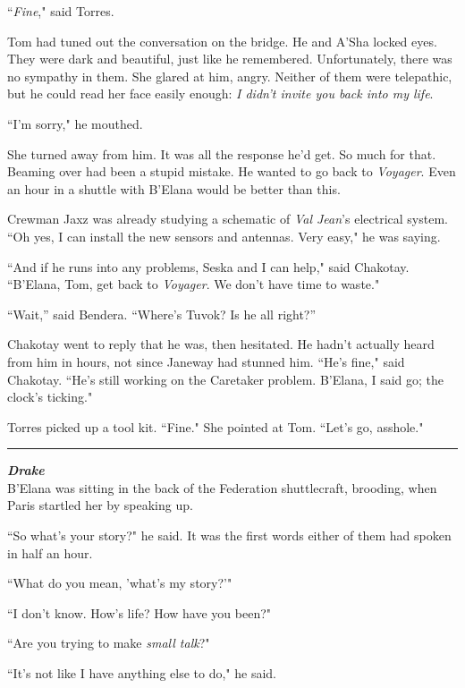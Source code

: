 \documentclass[twoside,letterpaper,12pt]{memoir}
\begin{document}
``\textit{Fine}," said Torres.

Tom had tuned out the conversation on the bridge. He and A'Sha locked eyes. They were dark and beautiful, just like he remembered. Unfortunately, there was no sympathy in them. She glared at him, angry. Neither of them were telepathic, but he could read her face easily enough: \textit{I didn't invite you back into my life}.

``I'm sorry," he mouthed.

She turned away from him. It was all the response he'd get. So much for that. Beaming over had been a stupid mistake. He wanted to go back to \textit{Voyager}. Even an hour in a shuttle with B'Elana would be better than this.

Crewman Jaxz was already studying a schematic of \textit{Val Jean}'s electrical system. ``Oh yes, I can install the new sensors and antennas. Very easy," he was saying.

``And if he runs into any problems, Seska and I can help," said Chakotay. ``B'Elana, Tom, get back to \textit{Voyager}. We don't have time to waste."

“Wait,” said Bendera. “Where’s Tuvok? Is he all right?”

Chakotay went to reply that he was, then hesitated. He hadn’t actually heard from him in hours, not since Janeway had stunned him. ``He's fine," said Chakotay. ``He's still working on the Caretaker problem. B'Elana, I said go; the clock's ticking."

Torres picked up a tool kit. ``Fine." She pointed at Tom. ``Let's go, asshole."

\begin{center}\rule{3cm}{0.4 pt}\end{center}

\noindent\textit{\textbf{Drake}}\\

B'Elana was sitting in the back of the Federation shuttlecraft, brooding, when Paris startled her by speaking up.

``So what's your story?" he said. It was the first words either of them had spoken in half an hour.

``What do you mean, 'what's my story?'"

``I don't know. How's life? How have you been?"

``Are you trying to make \textit{small talk}?"

``It's not like I have anything else to do," he said.
\end{document}

